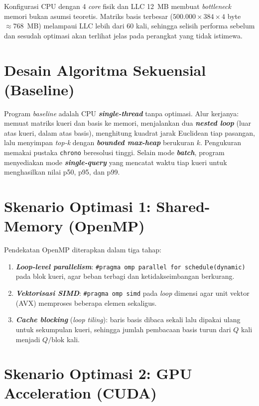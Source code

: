 \documentclass[12pt,a4paper,oneside]{report}
\newcommand{\keyword}[1]{\textbf{\textit{#1}}}
\begin{document}
Konfigurasi CPU dengan 4 \textit{core} fisik dan LLC 12~MB membuat \textit{bottleneck} memori bukan asumsi teoretis. Matriks basis terbesar ($500.000 \times 384 \times 4$ byte $\approx 768$~MB) melampaui LLC lebih dari 60 kali, sehingga selisih performa sebelum dan sesudah optimasi akan terlihat jelas pada perangkat yang tidak istimewa.

\section{Desain Algoritma Sekuensial (Baseline)}

Program \textit{baseline} adalah CPU \keyword{single-thread} tanpa optimasi. Alur kerjanya: memuat matriks kueri dan basis ke memori, menjalankan dua \keyword{nested loop} (luar atas kueri, dalam atas basis), menghitung kuadrat jarak Euclidean tiap pasangan, lalu menyimpan \textit{top-k} dengan \keyword{bounded max-heap} berukuran $k$. Pengukuran memakai pustaka \texttt{chrono} beresolusi tinggi. Selain mode \keyword{batch}, program menyediakan mode \keyword{single-query} yang mencatat waktu tiap kueri untuk menghasilkan nilai p50, p95, dan p99.

\section{Skenario Optimasi 1: Shared-Memory (OpenMP)}

Pendekatan OpenMP diterapkan dalam tiga tahap:
\begin{enumerate}[leftmargin=2em]
  \item \keyword{Loop-level parallelism}: \texttt{\#pragma omp parallel for schedule(dynamic)} pada blok kueri, agar beban terbagi dan ketidakseimbangan berkurang.
  \item \keyword{Vektorisasi SIMD}: \texttt{\#pragma omp simd} pada \textit{loop} dimensi agar unit vektor (AVX) memproses beberapa elemen sekaligus.
  \item \keyword{Cache blocking} (\textit{loop tiling}): baris basis dibaca sekali lalu dipakai ulang untuk sekumpulan kueri, sehingga jumlah pembacaan basis turun dari $Q$ kali menjadi $Q/\text{blok}$ kali.
\end{enumerate}

\section{Skenario Optimasi 2: GPU Acceleration (CUDA)}
\end{document}
